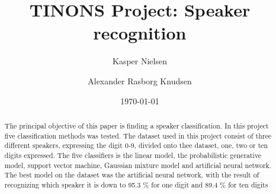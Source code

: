 

\usepackage[footnote,draft,english,silent,nomargin]{fixme}



\title{TINONS Project: Speaker recognition}

\author{Kasper Nielsen}%
\author{Alexander Rasborg Knudsen}%
\date{\today} %

\begin{abstract}
\bigskip
The principal objective of this paper is finding a speaker classification. 
In this project five classification methods was tested.
The dataset used in this project consist of three different speakers, expressing the digit 0-9, divided onto thee dataset, one, two or ten digits expressed.
The five classifiers is the linear model, the probabilistic generative model, support vector machine, Gaussian mixture model and artificial neural network.
The best model on the dataset was the artificial neural network, with the result of recognizing  which speaker it is down to 95.3 \% for one digit and 89.4 \% for ten digits  
\end{abstract}

\maketitle
\noindent







	 


	







\renewcommand{\bibname}{2 Reference Document}






